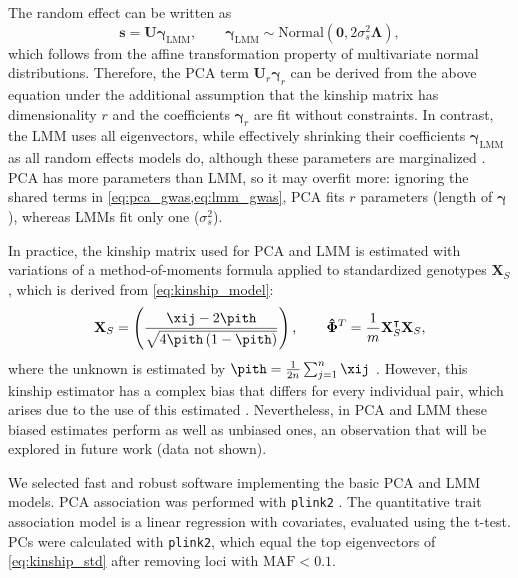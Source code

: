 \documentclass[11pt]{article}
\begin{document}
The random effect can be written as
$$
\mathbf{s} = \mathbf{U} \boldsymbol{\gamma}_\text{LMM},
\quad\quad
\boldsymbol{\gamma}_\text{LMM}
\sim \text{Normal}( \mathbf{0}, 2 \sigma_s^2 \boldsymbol{\Lambda})
,
$$
which follows from the affine transformation property of multivariate normal distributions.
Therefore, the PCA term $\mathbf{U}_r \boldsymbol{\gamma}_r$ can be derived from the above equation under the additional assumption that the kinship matrix has dimensionality $r$ and the coefficients $\boldsymbol{\gamma}_r$ are fit without constraints.
In contrast, the LMM uses all eigenvectors, while effectively shrinking their coefficients $\boldsymbol{\gamma}_\text{LMM}$ as all random effects models do, although these parameters are marginalized \citep{astle_population_2009, hoffman_correcting_2013}.
PCA has more parameters than LMM, so it may overfit more: ignoring the shared terms in \cref{eq:pca_gwas,eq:lmm_gwas}, PCA fits $r$ parameters (length of $\boldsymbol{\gamma}$), whereas LMMs fit only one ($\sigma^2_s$).

In practice, the kinship matrix used for PCA and LMM is estimated with variations of a method-of-moments formula applied to standardized genotypes $\mathbf{X}_S$, which is derived from \cref{eq:kinship_model}:
\begin{equation}
  \label{eq:kinship_std}
  \mathbf{X}_S
  =
  \left(
    \frac{
      \xij - 2 \pith
    }{
      \sqrt{4 \pith \left( 1 - \pith \right)}
    }
  \right)
  ,
  \quad\quad
  \mathbf{\hat{\Phi}}^T
  =
  \frac{1}{m}
  \mathbf{X}_S^\intercal
  \mathbf{X}_S
  ,
\end{equation}
where the unknown \pit is estimated by
$
\pith = \frac{1}{2n} \sum_{j = 1}^n \xij
$
\citep{price_principal_2006, kang_efficient_2008, kang_variance_2010, yang_gcta:_2011, zhou_genome-wide_2012, loh_efficient_2015, sul_population_2018, zhou_efficiently_2018}.
However, this kinship estimator has a complex bias that differs for every individual pair, which arises due to the use of this estimated \pith \citep{ochoa_estimating_2021, ochoa_human}.
Nevertheless, in PCA and LMM these biased estimates perform as well as unbiased ones, an observation that will be explored in future work (data not shown).

We selected fast and robust software implementing the basic PCA and LMM models.
PCA association was performed with \texttt{plink2} \citep{chang_second-generation_2015}.
The quantitative trait association model is a linear regression with covariates, evaluated using the t-test.
PCs were calculated with \texttt{plink2}, which equal the top eigenvectors of \cref{eq:kinship_std} after removing loci with $\text{MAF} < 0.1$.
\end{document}

